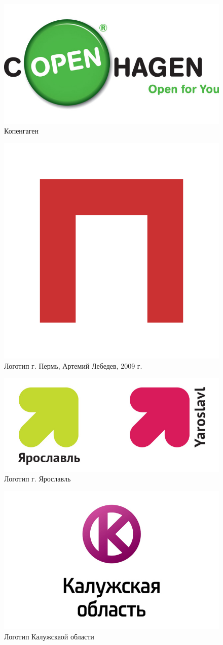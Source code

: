 \begin{figure}[ht]
  \centering
  \includegraphics[width=.5\linewidth]{images/supplement/territorial/copenhagen}
  \caption[]{Копенгаген}
  \label{fig:territorial:copenhagen}
\end{figure}

\begin{figure}[ht]
  \centering
  \includegraphics[width=.3\linewidth]{images/supplement/territorial/perm}
  \caption[]{Логотип г. Пермь, Артемий Лебедев, 2009 г.}
  \label{fig:territorial:perm}
\end{figure}

\begin{figure}[ht]
  \centering
  \includegraphics[width=.5\linewidth]{images/supplement/territorial/yaroslavl}
  \caption[]{Логотип г. Ярославль}
  \label{fig:territorial:yaroslavl}
\end{figure}

\begin{figure}[ht]
  \centering
  \includegraphics[width=.5\linewidth]{images/supplement/territorial/kaluga}
  \caption[]{Логотип Калужскаой области}
  \label{fig:territorial:kaluga}
\end{figure}

